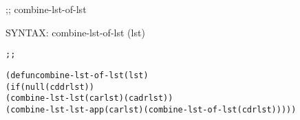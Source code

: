\begin{aibox}{\function}
;; combine-lst-of-lst

SYNTAX: combine-lst-of-lst (lst)
\end{aibox}

\begin{aibox}{\examples}

\end{aibox}

\begin{aibox}{\comments}

\end{aibox}
\begin{aibox}{\answers}

\end{aibox}
\begin{aibox}{\othercomments}

\end{aibox}
\begin{aibox}{\pseudocode}

\end{aibox}
\begin{aibox}{\code}

\begin{alltt}
;;%% code

(defun combine-lst-of-lst (lst)
    (if (null (cddr lst))
            (combine-lst-lst (car lst) (cadr lst))
    (combine-lst-lst-app (car lst) (combine-lst-of-lst (cdr lst)))))
\end{alltt}
\end{aibox}
